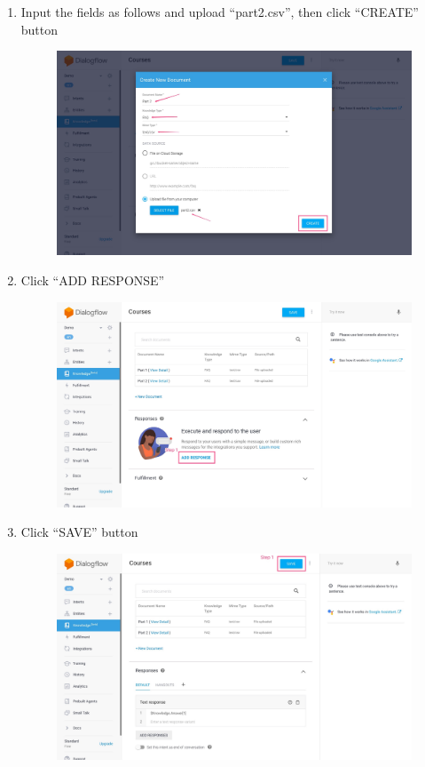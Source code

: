 \begin{enumerate}
	\item Input the fields as follows and upload “part2.csv”, then click “CREATE” button
	\nopagebreak
	\begin{figure}[H]
		\centering
		\includegraphics[width=\linewidth, frame]{img/manual_12.jpg}
	\end{figure}

	\item Click “ADD RESPONSE”
	\nopagebreak
	\begin{figure}[H]
		\centering
		\includegraphics[width=\linewidth, frame]{img/manual_13.jpg}
	\end{figure}

	\item Click “SAVE” button
	\nopagebreak
	\begin{figure}[H]
		\centering
		\includegraphics[width=\linewidth, frame]{img/manual_14.jpg}
	\end{figure}

\end{enumerate}

